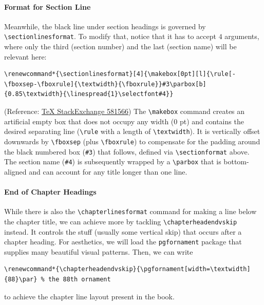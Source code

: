 \paragraph{Format for Section Line}
Meanwhile, the black line under section headings is governed by \texttt{\textbackslash sectionlinesformat}. To modify that, notice that it has to accept $4$ arguments, where only the third (section number) and the last (section name) will be relevant here:
\begin{lstlisting}
\renewcommand*{\sectionlinesformat}[4]{\makebox[0pt][l]{\rule[-\fboxsep-\fboxrule]{\textwidth}{\fboxrule}}#3\parbox[b]{0.85\textwidth}{\linespread{1}\selectfont#4}}
\end{lstlisting}
(Reference: \href{https://tex.stackexchange.com/questions/581566/section-formatting-with-boxed-numbering-and-horizontal-line}{\TeX{} StackExchange 581566}) The \texttt{\textbackslash makebox} command creates an artificial empty box that does not occupy any width ($0$ pt) and contains the desired separating line (\texttt{\textbackslash rule} with a length of \texttt{\textbackslash textwidth}). It is vertically offset downwards by \texttt{\textbackslash fboxsep} (plus \texttt{\textbackslash fboxrule}) to compensate for the padding around the black numbered box (\texttt{\#3}) that follows, defined via \texttt{\textbackslash sectionformat} above. The section name (\texttt{\#4}) is subsequently wrapped by a \texttt{\textbackslash parbox} that is bottom-aligned and can account for any title longer than one line.

\paragraph{End of Chapter Headings}
While there is also the \texttt{\textbackslash chapterlinesformat} command for making a line below the chapter title, we can achieve more by tackling \texttt{\textbackslash chapterheadendvskip} instead. It controls the stuff (usually some vertical skip) that occurs after a chapter heading. For aesthetics, we will load the \texttt{pgfornament} package that supplies many beautiful visual patterns. Then, we can write
\begin{lstlisting}
\renewcommand*{\chapterheadendvskip}{\pgfornament[width=\textwidth]{88}\par} % the 88th ornament
\end{lstlisting}
to achieve the chapter line layout present in the book.

